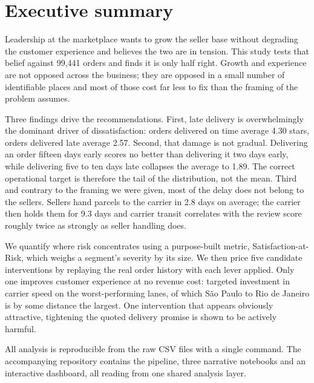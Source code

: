 \documentclass[11pt,a4paper]{article}
\begin{document}
\section*{Executive summary}

Leadership at the marketplace wants to grow the seller base without degrading the
customer experience and believes the two are in tension. This study tests that
belief against 99{,}441 orders and finds it is only half right. Growth and
experience are not opposed across the business; they are opposed in a small
number of identifiable places and most of those cost far less to fix than the
framing of the problem assumes.

Three findings drive the recommendations. First, late delivery is overwhelmingly
the dominant driver of dissatisfaction: orders delivered on time average 4.30
stars, orders delivered late average 2.57. Second, that damage is not gradual.
Delivering an order fifteen days early scores no better than delivering it two
days early, while delivering five to ten days late collapses the average to 1.89.
The correct operational target is therefore the tail of the distribution, not the
mean. Third and contrary to the framing we were given, most of the delay does not
belong to the sellers. Sellers hand parcels to the carrier in 2.8 days on average;
the carrier then holds them for 9.3 days and carrier transit correlates with the
review score roughly twice as strongly as seller handling does.

We quantify where risk concentrates using a purpose-built metric, Satisfaction-at-Risk,
which weighs a segment's severity by its size. We then price five candidate
interventions by replaying the real order history with each lever applied. Only one
improves customer experience at no revenue cost: targeted investment in carrier
speed on the worst-performing lanes, of which S\~{a}o Paulo to Rio de Janeiro is by
some distance the largest. One intervention that appears obviously attractive,
tightening the quoted delivery promise is shown to be actively harmful.

All analysis is reproducible from the raw CSV files with a single command. The
accompanying repository contains the pipeline, three narrative notebooks and an
interactive dashboard, all reading from one shared analysis layer.

\vspace{1em}
\newpage
\tableofcontents
\newpage

\end{document}
